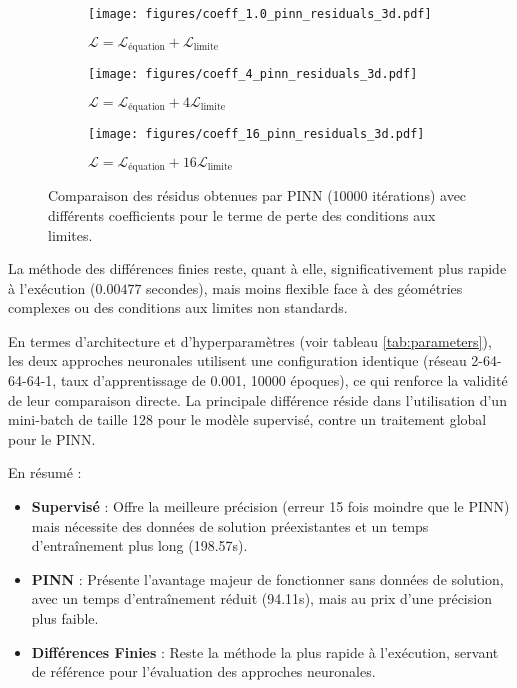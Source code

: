 \documentclass[11pt,a4paper]{article}
\begin{document}
\begin{figure}[H]
    \centering
    \begin{subfigure}{0.3\textwidth}
        \texttt{[image: figures/coeff\_1.0\_pinn\_residuals\_3d.pdf]}
        \caption{$\mathcal{L} = \mathcal{L}_\text{équation} + \mathcal{L}_\text{limite}$}
    \end{subfigure}
    \begin{subfigure}{0.3\textwidth}
        \texttt{[image: figures/coeff\_4\_pinn\_residuals\_3d.pdf]}
        \caption{$\mathcal{L} = \mathcal{L}_\text{équation} + 4\mathcal{L}_\text{limite}$}
    \end{subfigure}
    \begin{subfigure}{0.3\textwidth}
        \texttt{[image: figures/coeff\_16\_pinn\_residuals\_3d.pdf]}
        \caption{$\mathcal{L} = \mathcal{L}_\text{équation} + 16\mathcal{L}_\text{limite}$}
    \end{subfigure}
    \caption{Comparaison des résidus obtenues par PINN (10000 itérations) avec différents coefficients pour le terme de perte des conditions aux limites.}
    \label{fig:coef_exp_res}
\end{figure}

La méthode des différences finies reste, quant à elle, significativement plus rapide à l'exécution ($0.00477$ secondes), mais moins flexible face à des géométries complexes ou des conditions aux limites non standards. 

En termes d'architecture et d'hyperparamètres (voir tableau \ref{tab:parameters}), les deux approches neuronales utilisent une configuration identique (réseau 2-64-64-64-1, taux d'apprentissage de 0.001, 10000 époques), ce qui renforce la validité de leur comparaison directe. La principale différence réside dans l'utilisation d'un mini-batch de taille 128 pour le modèle supervisé, contre un traitement global pour le PINN.
\vspace{1em}

En résumé :
\begin{itemize}
    \item \textbf{Supervisé} : Offre la meilleure précision (erreur 15 fois moindre que le PINN) mais nécessite des données de solution préexistantes et un temps d'entraînement plus long (198.57s).
    \item \textbf{PINN} : Présente l'avantage majeur de fonctionner sans données de solution, avec un temps d'entraînement réduit (94.11s), mais au prix d'une précision plus faible.
    \item \textbf{Différences Finies} : Reste la méthode la plus rapide à l'exécution, servant de référence pour l'évaluation des approches neuronales.
\end{itemize}
\end{document}
